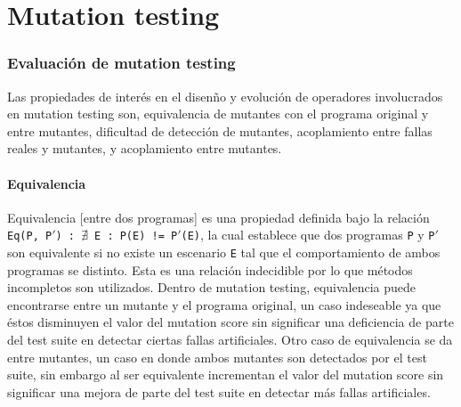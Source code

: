 \chapter[Mutation]{Mutation testing}
\label{sec:preliminares.mutation}


\subsection{Evaluaci\'on de mutation testing}

Las propiedades de inter\'es en el disen\~no y evoluci\'on de operadores involucrados en mutation testing son, equivalencia de mutantes con el programa original y entre mutantes, dificultad de detecci\'on de mutantes, acoplamiento entre fallas reales y mutantes, y acoplamiento entre mutantes.

\subsubsection{Equivalencia}
Equivalencia [entre dos programas] es una propiedad definida bajo la relaci\'on \texttt{Eq(P, P$\prime$) : $\nexists$ E : P(E) != P$\prime$(E)}, la cual establece que dos programas \texttt{P} y \texttt{P$\prime$} son equivalente si no existe un escenario \texttt{E} tal que el comportamiento de ambos programas se distinto. Esta es una relaci\'on indecidible por lo que m\'etodos incompletos son utilizados. Dentro de mutation testing, equivalencia puede encontrarse entre un mutante y el programa original, un caso indeseable ya que \'estos disminuyen el valor del mutation score sin significar una deficiencia de parte del test suite en detectar ciertas fallas artificiales. Otro caso de equivalencia se da entre mutantes, un caso en donde ambos mutantes son detectados por el test suite, sin embargo al ser equivalente incrementan el valor del mutation score sin significar una mejora de parte del test suite en detectar m\'as fallas artificiales.

